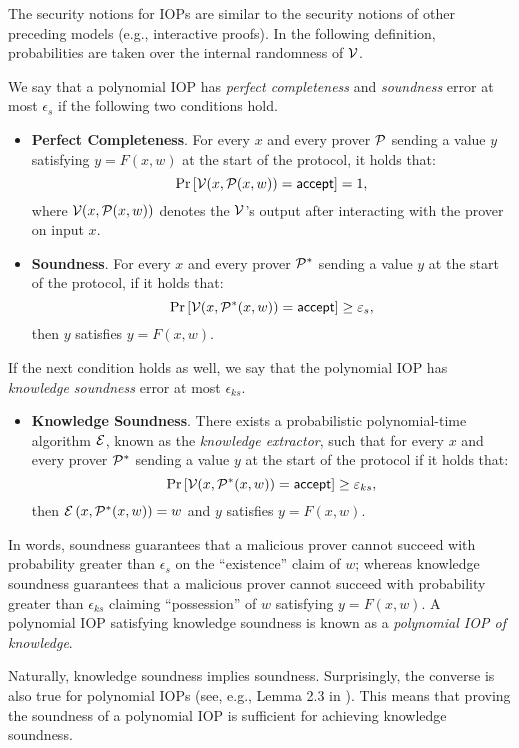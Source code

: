 The security notions for IOPs are similar to the security notions of other preceding models (e.g., interactive proofs). In the following definition, probabilities are taken over the internal randomness of $\V$.
\begin{definition}
  We say that a polynomial IOP has \textit{perfect completeness} and \textit{soundness} error at most $\epsilon_s$ if the following two conditions hold. 
  \begin{itemize}
    \item \textbf{Perfect Completeness}. For every $x$ and every prover $\P$ sending a value $y$ satisfying $y = F(x,w)$ at the start of the protocol, it holds that:
    \[
      \Pr\left[\V(x,\P(x,w)) = \accept\right] = 1,
    \]
    where $\V(x,\P(x,w))$ denotes the $\V$'s output after interacting with the prover on input $x$.
    \item \textbf{Soundness}. For every $x$ and every prover $\P^*$ sending a value $y$ at the start of the protocol, if it holds that:
    \[
      \Pr\left[\V(x,\P^*(x,w)) = \accept\right] \geq \epsilon_s,
    \]
    then $y$ satisfies $y = F(x,w)$.
  \end{itemize}
If the next condition holds as well, we say that the polynomial IOP has \textit{knowledge soundness} error at most $\epsilon_{ks}$.
  \begin{itemize}
    \item \textbf{Knowledge Soundness}. There exists a probabilistic polynomial-time algorithm $\E$, known as the \textit{knowledge extractor}, such that for every $x$ and every prover $\P^*$ sending a value $y$ at the start of the protocol if it holds that:
    \[
      \Pr\left[\V(x,\P^*(x,w)) = \accept\right] \geq \epsilon_{ks},
    \]
    then $\E\left(x,\P^*(x,w)\right) = w$ and $y$ satisfies $y = F(x,w)$.
  \end{itemize}
  In words, soundness guarantees that a malicious prover cannot succeed with probability greater than $\epsilon_s$ on the ``existence'' claim of $w$; whereas knowledge soundness guarantees that a malicious prover cannot succeed with probability greater than $\epsilon_{ks}$ claiming ``possession'' of $w$ satisfying $y = F(x,w)$. A polynomial IOP satisfying knowledge soundness is known as a \textit{polynomial IOP of knowledge}.
\end{definition}

Naturally, knowledge soundness implies soundness. Surprisingly, the converse is also true for polynomial IOPs (see, e.g., Lemma 2.3 in \cite{EPRINT:CBBZ22}). This means that proving the soundness of a polynomial IOP is sufficient for achieving knowledge soundness.

